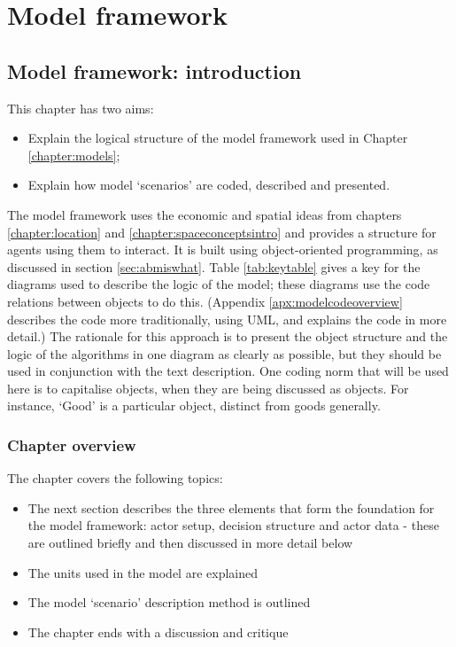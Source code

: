 \chapter{Model framework \label{chapter:modelfw}}

\section{Model framework: introduction \label{sec:frameworkintro}}

This chapter has two aims:

\begin{itemize}
	\item Explain the logical structure of the model framework used in Chapter \ref{chapter:models};
	\item Explain how model `scenarios' are coded, described and presented.
\end{itemize}

The model framework uses the economic and spatial ideas from chapters \ref{chapter:location} and \ref{chapter:spaceconceptsintro} and provides a structure for agents using them to interact. It is built using object-oriented programming, as discussed in section \ref{sec:abmiswhat}. Table \ref{tab:keytable} gives a key for the diagrams used to describe the logic of the model; these diagrams use the code relations between objects to do this. (Appendix \ref{apx:modelcodeoverview} describes the code more traditionally, using UML, and explains the code in more detail.) The rationale for this approach is to present the object structure and the logic of the algorithms in one diagram as clearly as possible, but they should be used in conjunction with the text description. One coding norm that will be used here is to capitalise objects, when they are being discussed as objects. For instance, `Good' is a particular object, distinct from goods generally. 

\subsection{Chapter overview}

The chapter covers the following topics:

\begin{itemize}
	\item The next section describes the three elements that form the foundation for the model framework: actor setup, decision structure and actor data - these are outlined briefly and then discussed in more detail below
	\item The units used in the model are explained
	\item The model `scenario' description method is outlined
	\item The chapter ends with a discussion and critique
\end{itemize}

